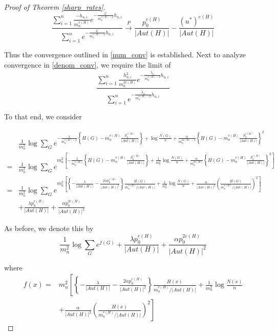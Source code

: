 \documentclass[12pt]{article}
\numberwithin{equation}{section}
\begin{document}
\begin{proof}[Proof of Theorem \ref{sharp_rates}]
$$\frac{\sum\limits_{i=1}^{n}\frac{-h_{n,i}}{m_n^{v(H)}}e^{-\frac{\lambda^{\circ}}{m_n^{v(H)-2}}h_{n,i}}}{\sum\limits_{i=1}^{n}e^{-\frac{\lambda^{\circ}}{m_n^{v(H)-2}}h_{n,i}}}\xrightarrow{P} \frac{p_0^{e(H)}}{\lvert Aut(H)\rvert} - \frac{(u^*)^{e(H)}}{\lvert Aut(H)\rvert}$$


Thus the convergence outlined in \eqref{num_conv} is established. Next to analyze convergence in  \eqref{denom_conv}, we require the limit of 
$$
\frac{\sum\limits_{i=1}^{n}\frac{h_{n,i}^2}{m_n^{2v(H)}}e^{-\frac{\tilde{\lambda}_n}{m_n^{v(H)-2}}h_{n,i}}}{\sum\limits_{i=1}^{n}e^{-\frac{\tilde{\lambda}_n}{m_n^{v(H)-2}}h_{n,i}}}
$$

To that end, we consider 

\begin{align*}
& \frac{1}{m_n^2} \log \sum_{G} e^{-\frac{\lambda}{m_n^{v(H)-2}} \left\{ H(G) - m_n^{v(H)} \frac{p_0^{e(H)}}{\lvert Aut(H)\rvert}\right\}  + \log \frac{N(G)}{n} + \frac{\alpha}{m_n^{2v(H)-2}} \left\{ H(G) - m_n^{v(H)}\frac{p_0^{e(H)}}{\lvert Aut(H)\rvert} \right\}^2} \\
=& \frac{1}{m_n^2} \log \sum_{G} e^{m_n^2 \left[ -\frac{\lambda}{m_n^{v(H)}} \left\{ H(G) - m_n^{v(H)} \frac{p_0^{e(H)}}{\lvert Aut(H)\rvert} \right\} + \frac{1}{m_n^2} \log \frac{N(G)}{n} + \frac{\alpha}{m_n^{2v(H)}} \left\{ H(G) - m_n^{v(H)} \frac{p_0^{e(H)}}{\lvert Aut(H)\rvert} \right\}^2 \right]} \\
=& \frac{1}{m_n^2} \log \sum_{G} e^{m_n^2 \left[ \left\{-\frac{\lambda}{\lvert Aut(H)\rvert} - \frac{2\alpha p_0^{e(H)}}{\lvert Aut(H)\rvert^2}\right\} \frac{H(G)}{m_n^{v(H)}/\lvert Aut(H)\rvert} + \frac{1}{m_n^2} \log \frac{N(G)}{n} + \frac{\alpha}{\lvert Aut(H)\rvert^2} \left( \frac{H(G)}{m_n^{v(H)}/\lvert Aut(H)\rvert} \right)^2 \right]}  \\
&+\frac{\lambda p_0^{e(H)}}{\lvert Aut(H)\rvert} + \frac{\alpha p_0^{2e(H)}}{\lvert Aut(H)\rvert^2}
\end{align*}

As before, we denote this by
\begin{equation}
\label{eq:f_def2}
\frac{1}{m_n^2} \log \sum_{G} e^{f(G)} + \frac{\lambda p_0^{e(H)}}{\lvert Aut(H)\rvert} + \frac{\alpha p_0^{2e(H)}}{\lvert Aut(H)\rvert^2}
\end{equation}

where 
\begin{align}f(x)=&m_n^2 \left[ \left\{-\frac{\lambda}{\lvert Aut(H)\rvert} - \frac{2\alpha p_0^{e(H)}}{\lvert Aut(H)\rvert^2}\right\} \frac{H(x)}{m_n^{v(H)}/\lvert Aut(H)\rvert} + \frac{1}{m_n^2} \log \frac{N(x)}{n}\right.\nonumber\\
&\left.+ \frac{\alpha}{\lvert Aut(H)\rvert^2} \left( \frac{H(x)}{m_n^{v(H)}/\lvert Aut(H)\rvert} \right)^2 \right]
\label{energy_function}\end{align}




\end{proof}
\end{document}

